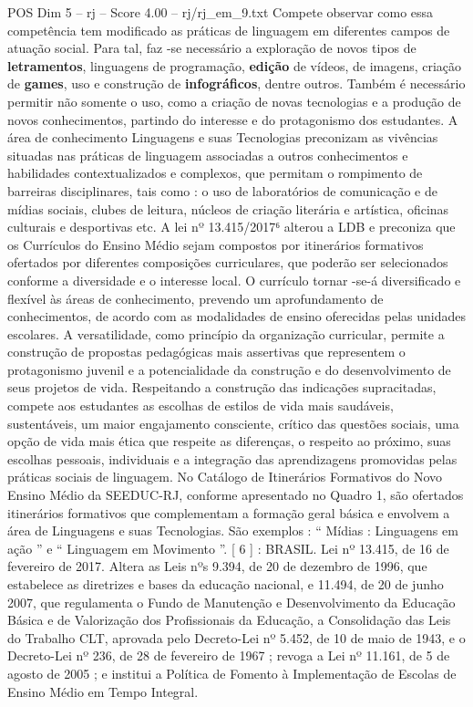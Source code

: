 \begin{textsample}{POS Dim 5 – rj – Score 4.00 – rj/rj\_em\_9.txt}
Compete observar como essa competência tem modificado as práticas de linguagem em diferentes campos de atuação social.
Para tal, faz -se necessário a exploração de novos tipos de \textbf{letramentos}, linguagens de programação, \textbf{edição} de vídeos, de imagens, criação de \textbf{games}, uso e construção de \textbf{infográficos}, dentre outros.
Também é necessário permitir não somente o uso, como a criação de novas tecnologias e a produção de novos conhecimentos, partindo do interesse e do protagonismo dos estudantes.
A área de conhecimento Linguagens e suas Tecnologias preconizam as vivências situadas nas práticas de linguagem associadas a outros conhecimentos e habilidades contextualizados e complexos, que permitam o rompimento de barreiras disciplinares, tais como : o uso de laboratórios de comunicação e de mídias sociais, clubes de leitura, núcleos de criação literária e artística, oficinas culturais e desportivas etc.
A lei nº 13.415/2017⁶ alterou a LDB e preconiza que os Currículos do Ensino Médio sejam compostos por itinerários formativos ofertados por diferentes composições curriculares, que poderão ser selecionados conforme a diversidade e o interesse local.
O currículo tornar -se-á diversificado e flexível às áreas de conhecimento, prevendo um aprofundamento de conhecimentos, de acordo com as modalidades de ensino oferecidas pelas unidades escolares.
A versatilidade, como princípio da organização curricular, permite a construção de propostas pedagógicas mais assertivas que representem o protagonismo juvenil e a potencialidade da construção e do desenvolvimento de seus projetos de vida.
Respeitando a construção das indicações supracitadas, compete aos estudantes as escolhas de estilos de vida mais saudáveis, sustentáveis, um maior engajamento consciente, crítico das questões sociais, uma opção de vida mais ética que respeite as diferenças, o respeito ao próximo, suas escolhas pessoais, individuais e a integração das aprendizagens promovidas pelas práticas sociais de linguagem.
No Catálogo de Itinerários Formativos do Novo Ensino Médio da SEEDUC-RJ, conforme apresentado no Quadro 1, são ofertados itinerários formativos que complementam a formação geral básica e envolvem a área de Linguagens e suas Tecnologias.
São exemplos : “ Mídias : Linguagens em ação ” e “ Linguagem em Movimento ”. [ 6 ] : BRASIL.
Lei nº 13.415, de 16 de fevereiro de 2017.
Altera as Leis nºs 9.394, de 20 de dezembro de 1996, que estabelece as diretrizes e bases da educação nacional, e 11.494, de 20 de junho 2007, que regulamenta o Fundo de Manutenção e Desenvolvimento da Educação Básica e de Valorização dos Profissionais da Educação, a Consolidação das Leis do Trabalho CLT, aprovada pelo Decreto-Lei nº 5.452, de 10 de maio de 1943, e o Decreto-Lei nº 236, de 28 de fevereiro de 1967 ; revoga a Lei nº 11.161, de 5 de agosto de 2005 ; e institui a Política de Fomento à Implementação de Escolas de Ensino Médio em Tempo Integral.

\end{textsample}
